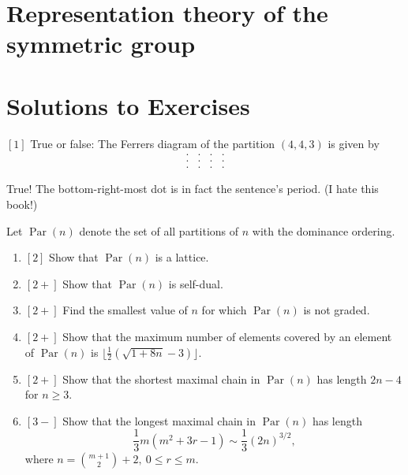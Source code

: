 \documentclass{article}
\DeclareMathOperator{\Par}{Par}
\begin{document}
\begin{theorem}
\end{theorem}

\section{Representation theory of the symmetric group}



\iffalse 

\section{Solutions to Exercises}

\begin{exercise}
    $[1]$
    True or false: The Ferrers diagram of the partition $(4,4,3)$ is given by
    \[
        \begin{matrix}
            . & . & . & . \\
            . & . & . & . \\
            . & . & . & .
        \end{matrix}
    \]
\end{exercise}

True! The bottom-right-most dot is in fact the sentence's period. (I hate this book!)

\begin{exercise}
    Let $\Par(n)$ denote the set of all partitions of $n$ with the dominance ordering.
    \begin{enumerate}[label=(\alph*)]
        \item $[2]$ Show that $\Par(n)$ is a lattice.
        \item $[2+]$ Show that $\Par(n)$ is self-dual.
        \item $[2+]$ Find the smallest value of $n$ for which $\Par(n)$ is not graded.
        \item $[2+]$ Show that the maximum number of elements covered by an element of $\Par(n)$ is $\lfloor \frac{1}{2}(\sqrt{1+8n}-3)\rfloor$.
        \item $[2+]$ Show that the shortest maximal chain in $\Par(n)$ has length $2n-4$ for $n \geq 3$.
        \item $[3-]$ Show that the longest maximal chain in $\Par(n)$ has length
            \[
                \frac{1}{3}m(m^2+3r-1) \sim \frac{1}{3}(2n)^{3/2},
            \]
            where $n = \binom{m+1}{2} + 2,\:0 \leq r \leq m$.
    \end{enumerate}
\end{exercise}
\end{document}
